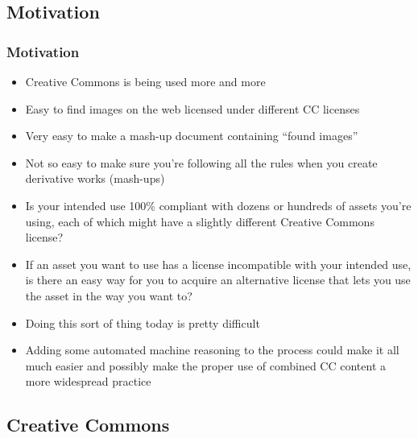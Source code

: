 \documentclass[mathserif,xcolor=dvipsnames,hyperref={bookmarks=true}]{beamer}
\begin{document}
    \subsection{Motivation}
    \begin{frame}[t]
        \frametitle{Motivation}
        \begin{itemize}
            \item<2-> Creative Commons is being used more and more
            \item<3-> Easy to find images on the web licensed under different CC licenses
            \item<4-> Very easy to make a mash-up document containing ``found images''
            \item<5-> Not so easy to make sure you're following all the rules when
                  you create derivative works (mash-ups)
            \item<6-> Is your intended use 100\% compliant with dozens or hundreds
                  of assets you're using, each of which might have a slightly different
                  Creative Commons license?
            \item<7-> If an asset you want to use has a license incompatible with
                  your intended use, is there an easy way for you to acquire an alternative
                  license that lets you use the asset in the way you want to?
            \item<8-> Doing this sort of thing today is pretty difficult
            \item<9-> Adding some automated machine reasoning to the process could
                  make it all much easier and possibly make the proper use of combined CC content
                  a more widespread practice
        \end{itemize}
    \end{frame}

    \subsection{Creative Commons}
\end{document}
